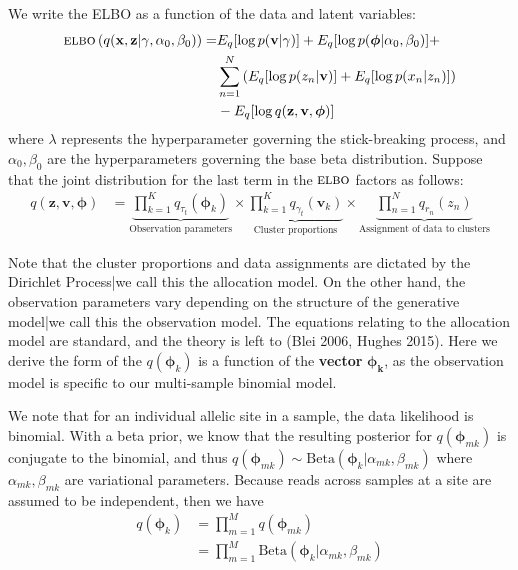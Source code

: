 \documentclass[11pt]{article}
\newcommand{\bx}{\ensuremath{\mathbf{x}}}
\newcommand{\bz}{\ensuremath{\mathbf{z}}}
\newcommand{\ELBO}{\textsc{elbo}}
\begin{document}
We write the ELBO as a function of the data and latent variables:
\begin{equation}
	\begin{split}
		\ELBO\left(q(\bx, \bz | \gamma, \alpha_0, \beta_0)\right) = &E_q[\log p(\mathbf{v} | \gamma)] + E_q[ \log p(\bm{\phi} | \alpha_0, \beta_0)] + \\ &\sum\limits_{n=1}^N \left( E_q[\log p(z_n | \mathbf{v})] + E_q[\log p(x_n | z_n)]\right) \\  &- E_q[\log q(\bz, \mathbf{v}, \bm{\phi})]
	\end{split}
\end{equation}
where $\lambda$ represents the hyperparameter governing the stick-breaking process, and $\alpha_0, \beta_0$ are the hyperparameters governing the base beta distribution. Suppose that the joint distribution for the last term in the $\ELBO$ factors as follows:
\begin{align}
    q(\bz, \mathbf{v}, \bm{\phi}) &=
\underbrace{\prod\limits_{k=1}^K q_{\tau_t}(\bm{\phi}_k)}_{\text{Observation parameters}} \times
 \underbrace{\prod\limits_{k=1}^K q_{\gamma_t}(\mathbf{v}_k)}_{\text{Cluster proportions}} \times
 \underbrace{\prod\limits_{n=1}^{N} q_{r_n}(z_n)}_{\text{Assignment of data to clusters}} \nonumber
\end{align}

Note that the cluster proportions and data assignments are dictated by the Dirichlet Process|we call this the allocation model. On the other hand, the observation parameters vary depending on the structure of the generative model|we call this the observation model. The equations relating to the allocation model are standard, and the theory is left to (Blei 2006, Hughes 2015). Here we derive the form of the  $q(\bm{\phi}_k)$ is a function of the \textbf{vector} $\bm{\phi_k}$, as the observation model is specific to our multi-sample binomial model.

We note that for an individual allelic site in a sample, the data likelihood is binomial. With a beta prior, we know that the resulting posterior for $q(\bm{\phi}_{mk})$ is conjugate to the binomial, and thus $q(\bm{\phi}_{mk}) \sim \mathrm{Beta}(\bm{\phi}_k | \alpha_{mk}, \beta_{mk})$ where $\alpha_{mk}, \beta_{mk}$ are variational parameters. Because reads across samples at a site are assumed to be independent, then we have 
\begin{align*}
q(\bm{\phi}_k)  &= \prod\limits_{m=1}^M q(\bm{\phi}_{mk}) \\
				&= \prod\limits_{m=1}^M \mathrm{Beta}(\bm{\phi}_k | \alpha_{mk}, \beta_{mk})
\end{align*}
\end{document}
